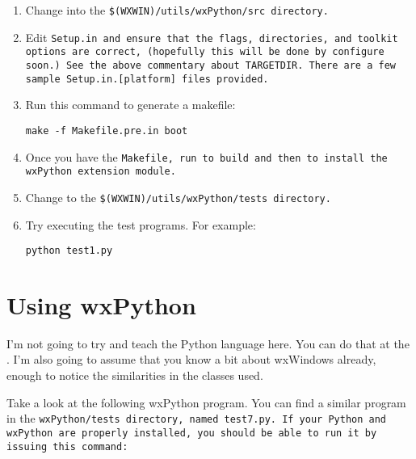 \begin{enumerate}\itemsep=0pt
\item Change into the \tt{\$(WXWIN)/utils/wxPython/src} directory.

\item Edit \tt{Setup.in} and ensure that the flags, directories, and toolkit
options are correct, (hopefully this will be done by \tt{configure}
soon.)  See the above commentary about \tt{TARGETDIR}.  There are a
few sample Setup.in.[platform] files provided.

\item Run this command to generate a makefile:

    \tt{make -f Makefile.pre.in boot}

\item Once you have the \tt{Makefile}, run  to build and then
 to install the wxPython extension module.

\item Change to the \tt{\$(WXWIN)/utils/wxPython/tests} directory.

\item Try executing the test programs.  For example:

    \tt{python test1.py}

\end{enumerate}



\section{Using wxPython}\label{wxpusing}


I'm not going to try and teach the Python language here.  You can do
that at the .
I'm also going to assume that you know a bit about wxWindows already,
enough to notice the similarities in the classes used.

Take a look at the following wxPython program.  You can find a similar
program in the \tt{wxPython/tests} directory, named \tt{test7.py}.  If your
Python and wxPython are properly installed, you should be able to run
it by issuing this command:

\begin{indented}{1cm}
\end{indented}

